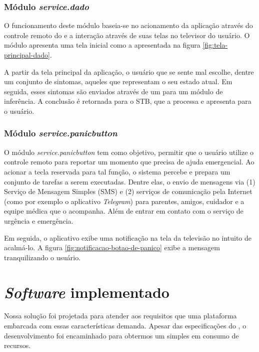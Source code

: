 \subsubsection{Módulo \textit{service.dado}}\label{subsubsec:dado}

O funcionamento deste módulo baseia-se no acionamento da aplicação através
do controle remoto do \stb[] e a interação através de suas telas no televisor
do usuário. O módulo apresenta uma tela inicial como a apresentada na 
figura \ref{fig:tela-principal-dado}.

A partir da tela principal da aplicação, o usuário que se sente mal escolhe, 
dentre um conjunto de sintomas, aqueles que representam o seu estado atual. Em
seguida, esses sintomas são enviados através de um \webservice[] para um
módulo de inferência. A conclusão é retornada para o STB, que a processa e 
apresenta para o usuário.

\subsubsection{Módulo \textit{service.panicbutton}}\label{subsubsec:panicbutton}

O módulo \textit{service.panicbutton} tem como objetivo, permitir que o usuário
utilize o controle remoto para reportar um momento que precisa de ajuda 
emergencial. Ao acionar a tecla reservada para tal função, o sistema percebe e
prepara um conjunto de tarefas a serem executadas. Dentre elas, o envio de 
mensagens via (1) Serviço de Mensagem Simples (SMS) e (2) serviços de comunicação
pela Internet (como por exemplo o aplicativo \textit{Telegram}) para parentes, 
amigos, cuidador e a equipe médica que o acompanha. Além de entrar em contato
com o serviço de urgência e emergência.

Em seguida, o aplicativo exibe uma notificação na tela da televisão no intuito
de acalmá-lo. A figura \ref{fig:notificacao-botao-de-panico} exibe a mensagem 
tranquilizando o usuário.

\section{\textit{Software} implementado}\label{sec:software-implementado}

Nossa solução foi projetada para atender aos requisitos que uma plataforma
embarcada com essas características demanda. Apesar das especificações do
\hardware[], o desenvolvimento foi encaminhado para obtermos um \software[]
simples em consumo de recursos.

